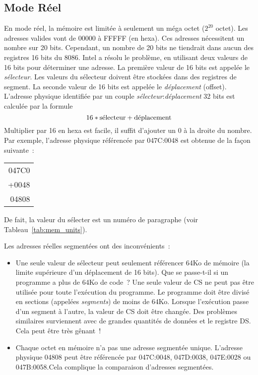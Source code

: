 \newpage
\subsection{Mode Réel\label{real_mode} }

En  mode réel, la mémoire est limitée à seulement un
méga octet ($2^{20}$ octet). 
Les adresses valides vont de 00000 à FFFFF (en hexa).\@ %
Ces adresses nécessitent un nombre sur 20 bits. Cependant, un nombre de 20 bits ne tiendrait
dans aucun des registres 16 bits du 8086. Intel a résolu le problème, en utilisant
deux valeurs de 16 bits pour déterminer une adresse. La première valeur de 16 bits
est appelée le \emph{sélecteur}. Les valeurs du sélecteur doivent être stockées dans des
registres de segment. La seconde valeur de 16 bits est appelée le \emph{déplacement}
(offset). L'adresse physique identifiée par un couple \emph{sélecteur}:\emph{déplacement}
32 bits est calculée par la formule \[ 16 * {\rm s\acute{e}lecteur} + {\rm d\acute{e}placement} \]
Multiplier par 16 en hexa est facile, il suffit d'ajouter un 0 à la droite du nombre.
Par exemple, l'adresse physique référencée par 047C:0048 est obtenue de la façon suivante~:
\begin{center}
\begin{tabular}{r}
047C0 \\
+0048 \\
\hline
04808 \\
\end{tabular}
\end{center}
De fait, la valeur du sélecter est un numéro de paragraphe
(voir Tableau~\ref{tab:mem_units}).

Les adresses réelles segmentées ont des inconvénients~:
\begin{itemize}
\item Une seule valeur de sélecteur peut seulement référencer 64Ko de mémoire
(la limite supérieure d'un déplacement de 16 bits). Que se passe-t-il si
un programme a plus de 64Ko de code~? Une seule valeur de CS ne peut pas être utilisée 
pour toute l'exécution du programme. Le programme doit être divisé en
sections (appelées \emph{segments}) de moins de 64Ko. Lorsque l'exécution passe d'un
segment à l'autre, la valeur de CS doit être changée. Des problèmes similaires
surviennent avec de grandes quantités de données et le registre DS. Cela
peut être très gênant~!

\item Chaque octet en mémoire n'a pas une adresse segmentée unique. L'adresse
physique 04808 peut être référencée par  047C:0048, 047D:0038, 047E:0028
ou 047B:0058.\@ Cela complique la comparaison d'adresses segmentées.

\end{itemize}

